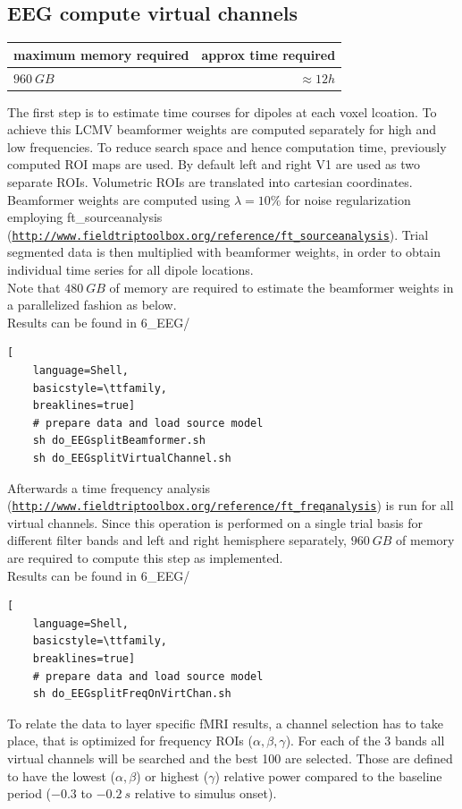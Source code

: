 \documentclass[12pt,a4paper]{scrartcl}
\begin{document}
\subsection{EEG compute virtual channels}

\begin{table}[h]
\begin{tabular}{l | r}
\toprule
maximum memory required & approx time required\\\toprule
$960~GB$ & $\approx 12h$ \\\bottomrule
\end{tabular}
\end{table}
The first step is to estimate time courses for dipoles at each voxel lcoation. To achieve this LCMV beamformer weights are computed separately for high and low frequencies. To reduce search space and hence computation time, previously computed ROI maps are used. By default left and right V1 are used as two separate ROIs. Volumetric ROIs are translated into cartesian coordinates. Beamformer weights are computed using $\lambda=10\%$ for noise regularization employing ft\_sourceanalysis (\href{http://www.fieldtriptoolbox.org/reference/ft\_sourceanalysis}{\nolinkurl{http://www.fieldtriptoolbox.org/reference/ft\_sourceanalysis}}). Trial segmented data is then multiplied with beamformer weights, in order to obtain individual time series for all dipole locations.\\
Note that $480~GB$ of memory are required to estimate the beamformer weights in a parallelized fashion as below.\\

\noindent Results can be found in 6\_EEG/\\
\begin{lstlisting}[
    language=Shell,
    basicstyle=\ttfamily,
    breaklines=true]
    # prepare data and load source model
    sh do_EEGsplitBeamformer.sh
    sh do_EEGsplitVirtualChannel.sh
\end{lstlisting}
Afterwards a time frequency analysis (\href{http://www.fieldtriptoolbox.org/reference/ft\_freqanalysis}{\nolinkurl{http://www.fieldtriptoolbox.org/reference/ft\_freqanalysis}}) is run for all virtual channels. Since this operation is performed on a single trial basis for different filter bands and left and right hemisphere separately, $960~GB$ of memory are required to compute this step as implemented.\\

\noindent Results can be found in 6\_EEG/\\
\begin{lstlisting}[
    language=Shell,
    basicstyle=\ttfamily,
    breaklines=true]
    # prepare data and load source model
    sh do_EEGsplitFreqOnVirtChan.sh
\end{lstlisting}
To relate the data to layer specific fMRI results, a channel selection has to take place, that is optimized for frequency ROIs ($\alpha, \beta, \gamma$). For each of the 3 bands all virtual channels will be searched and the best 100 are selected. Those are defined to have the lowest ($\alpha, \beta$) or highest ($\gamma$) relative power compared to the baseline period ($-0.3$ to $-0.2~s$ relative to simulus onset).\\
\end{document}
